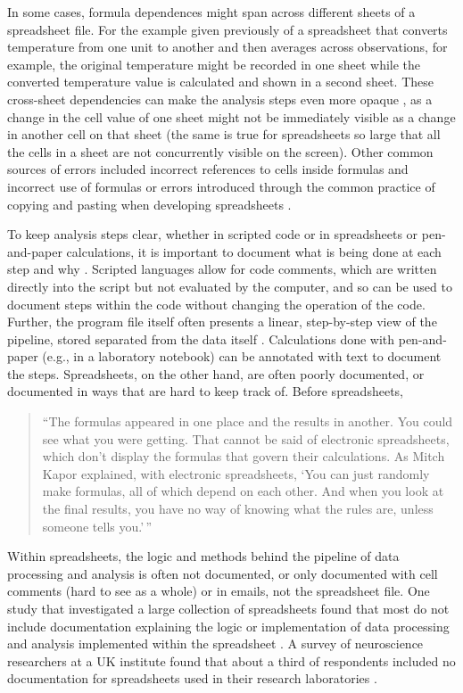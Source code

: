 \documentclass[]{tufte-book}
\begin{document}
In some cases, formula dependences might span across different sheets of a
spreadsheet file. For the example given previously of a spreadsheet that converts
temperature from one unit to another and then averages across observations, for
example, the original temperature might be recorded in one sheet while the
converted temperature value is calculated and shown in a second sheet. These
cross-sheet dependencies can make the analysis steps even more opaque
\citep{hermans2016spreadsheets}, as a change in the cell value of one sheet might not
be immediately visible as a change in another cell on that sheet (the same is
true for spreadsheets so large that all the cells in a sheet are not
concurrently visible on the screen). Other common sources of errors included
incorrect references to cells inside formulas and incorrect use of formulas
\citep{powell2009errors} or errors introduced through the common practice of copying
and pasting when developing spreadsheets \citep{hermans2016spreadsheets}.

To keep analysis steps clear, whether in scripted code or in spreadsheets or
pen-and-paper calculations, it is important to document what is being done at
each step and why \citep{goodman2014ten}. Scripted languages allow for code comments,
which are written directly into the script but not evaluated by the computer,
and so can be used to document steps within the code without changing the
operation of the code. Further, the program file itself often presents a linear,
step-by-step view of the pipeline, stored separated from the data itself
\citep{creeth1985microcomputer}. Calculations done with pen-and-paper (e.g., in a
laboratory notebook) can be annotated with text to document the steps.
Spreadsheets, on the other hand, are often poorly documented, or documented in
ways that are hard to keep track of. Before spreadsheets,

\begin{quote}
``The formulas appeared in one place and the results in another. You could see
what you were getting. That cannot be said of electronic spreadsheets, which
don't display the formulas that govern their calculations. As Mitch Kapor
explained, with electronic spreadsheets, `You can just randomly make formulas,
all of which depend on each other. And when you look at the final results, you
have no way of knowing what the rules are, unless someone tells you.'\,''
\citep{levy1984spreadsheet}
\end{quote}

Within spreadsheets, the logic and methods behind the pipeline of data
processing and analysis is often not documented, or only documented with cell
comments (hard to see as a whole) or in emails, not the spreadsheet file.
One study that investigated a large collection of spreadsheets found that most
do not include documentation explaining the logic or implementation of data
processing and analysis implemented within the spreadsheet
\citep{hermans2016spreadsheets}. A survey of neuroscience researchers at a UK
institute found that about a third of respondents included no documentation
for spreadsheets used in their research laboratories \citep{altarawneh2017pilot}.
\end{document}
